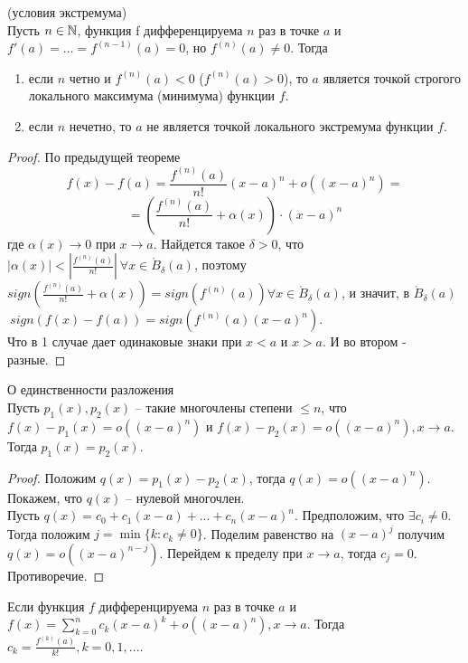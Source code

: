 \begin{corollary} (условия экстремума)\\
    Пусть $n \in \mathbb{N}$, функция f дифференцируема $n$ раз в точке $a$ и $f'(a) = \dots = f^{(n-1)}(a) = 0$,
    но $f^{(n)}(a) \neq 0$. Тогда
    \begin{enumerate}
        \item если $n$ четно и $f^{(n)}(a) < 0$ ($f^{(n)}(a) > 0$), то $a$ является точкой
        строгого локального максимума (минимума) функции $f$.
        \item если $n$ нечетно, то $a$ не является точкой локального
        экстремума функции $f$.
    \end{enumerate}
\end{corollary}

\begin{proof}
    По предыдущей теореме
    \[f(x) - f(a) = \frac{f^{(n)}(a)}{n!}(x-a)^n + o((x-a)^n) =\]
    \[= (\frac{f^{(n)}(a)}{n!} + \alpha(x))\cdot (x-a)^n\]
    где $\alpha(x) \to 0$ при $x \to a$. Найдется такое $\delta > 0$,
    что $|\alpha(x)| < |\frac{f^{(n)}(a)}{n!}| \ \forall x \in \mathring{B}_{\delta}(a)$,
    поэтому $sign(\frac{f^{(n)}(a)}{n!} + \alpha(x)) = sign(f^{(n)}(a)) \forall x \in \mathring{B}_{\delta}(a)$,
    и значит, в $\mathring{B}_{\delta}(a)$ $\ sign(f(x) - f(a)) = sign(f^{(n)}(a)(x-a)^n)$.\\
    Что в 1 случае дает одинаковые знаки при $x < a$ и $x > a$. И во втором - разные.
\end{proof}

\begin{theorem}{О единственности разложения}\\
    Пусть $p_{1}(x), p_{2}(x)$ -- такие многочлены степени $\leq n$, что $f(x) - p_{1}(x) = o((x-a)^{n})$
    и $f(x) - p_{2}(x) = o((x-a)^{n}), x \to a$. Тогда $p_{1}(x) = p_{2}(x)$.
\end{theorem}

\begin{proof}
    Положим $q(x) = p_{1}(x) - p_{2}(x)$, тогда $q(x) = o((x-a)^{n})$. Покажем, что $q(x)$ -- нулевой многочлен.\\
    Пусть $q(x) = c_{0} + c_{1}(x-a) + ... + c_{n}(x-a)^{n}$. Предположим, что $\exists c_{i} \neq 0$. Тогда положим $j = \min\{k: c_{k} \neq 0\}$. Поделим равенство на $(x-a)^{j}$ получим $q(x) = o((x-a)^{n-j})$. Перейдем к пределу при $x \to a$, тогда $c_{j} = 0$. Противоречие.
\end{proof}

\begin{corollary}
    Если функция $f$ дифференцируема $n$ раз в точке $a$ и $f(x) = \sum\limits_{k = 0}^{n} c_{k}(x-a)^{k} + o((x - a)^{n}), x \to a$. Тогда $c_{k} = \frac{f^{(k)}(a)}{k!}, k = 0, 1, ...$.
\end{corollary}

